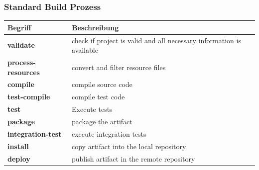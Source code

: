 \documentclass[10pt]{article}
\begin{document}
    \subsubsection{Standard Build Prozess}
    \begin{center}
    	
    \begin{tabular}{|ll|c}
        \hline
        Begriff & Beschreibung  \\
        \hline
        \textbf{validate} & check if project is valid and all necessary information is available \\
        \textbf{process-resources} & convert and filter resource files \\
        \textbf{compile} & compile source code \\
        \textbf{test-compile} & compile test code \\
        \textbf{test} & Execute tests \\
        \textbf{package} & package the artifact \\
        \textbf{integration-test} & execute integration tests \\
        \textbf{install} & copy artifact into the local repository \\
        \textbf{deploy} & publish artifact in the remote repository \\
        \hline
    \end{tabular}
     \end{center}
	
	\newpage
\end{document}
